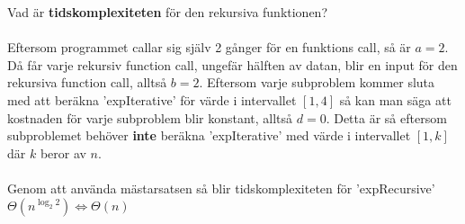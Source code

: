 \documentclass{report}
\begin{document}
\noindent
Vad är \textbf{tidskomplexiteten} för den rekursiva funktionen?\\\\
Eftersom programmet callar sig själv 2 gånger för en funktions call, så är $ a = 2 $. Då får varje rekursiv function call, ungefär hälften av datan, blir en input för den rekursiva function call, alltså $ b = 2 $. Eftersom varje subproblem kommer sluta med att beräkna 'expIterative' för värde i intervallet $ [1,4] $ så kan man säga att kostnaden för varje subproblem blir konstant, alltså $ d=0 $. Detta är så eftersom subproblemet behöver \textbf{inte} beräkna 'expIterative' med värde i intervallet $ [1,k] $ där $ k $ beror av $ n $.\\\\
\noindent
{}
\noindent
Genom att använda mästarsatsen så blir tidskomplexiteten för 'expRecursive' $ \Theta(n^{\log_{2}2}) \iff \Theta(n)$ 
\end{document}
